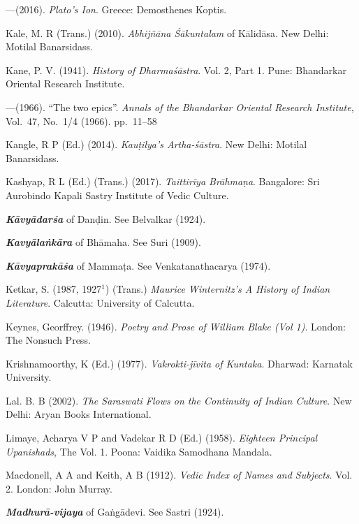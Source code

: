 \begin{thebibliography}{99}
---\kern3pt(2016). {\sl Plato’s Ion}. Greece: Demosthenes Koptis. 

Kale, M. R (Trans.) (2010). {\sl Abhijñāna Śākuntalam} of Kālidāsa. New Delhi: Motilal Banarsidass. 

Kane, P. V. (1941). {\sl History of Dharmaśāstra}. Vol. 2, Part 1. Pune: Bhandarkar Oriental Research Institute. 

---\kern3pt(1966). “The two epics”. {\sl Annals of the Bhandarkar Oriental Research Institute}, Vol.~47, No.~1/4 (1966). pp.~11--58 

Kangle, R P (Ed.) (2014). {\sl Kauṭilya’s Artha-śāstra}. New Delhi: Motilal Banarsidass. 

Kashyap, R L (Ed.) (Trans.) (2017). {\sl Taittirīya Brāhmaṇa}. Bangalore: Sri Aurobindo Kapali Sastry Institute of Vedic Culture. 

{\sl\bfseries Kāvyādarśa} of Danḍin. See Belvalkar (1924).  

{\sl\bfseries Kavyālaṅkāra} of Bhāmaha. See Suri (1909).

{\sl\bfseries Kāvyaprakāśa} of Mammaṭa. See Venkatanathacarya (1974).

Ketkar, S. (1987, 1927$^{1}$) (Trans.) {\sl Maurice Winternitz’s A History of Indian Literature}. Calcutta: University of Calcutta. 

Keynes, Georffrey. (1946). {\sl Poetry and Prose of William Blake (Vol 1)}. London: The Nonsuch Press. 

Krishnamoorthy, K (Ed.) (1977). {\sl Vakrokti-jīvita of Kuntaka}. Dharwad: Karnatak University. 

Lal. B. B (2002). {\sl The Saraswati Flows on the Continuity of Indian Culture}. New Delhi: Aryan Books International. 

Limaye, Acharya V P and Vadekar R D (Ed.) (1958). {\sl Eighteen Principal Upanishads}, The Vol. 1. Poona: Vaidika Samodhana Mandala.

Macdonell, A A and Keith, A B (1912). {\sl Vedic Index of Names and Subjects}. Vol. 2. London: John Murray.

{\sl\bfseries Madhurā-vijaya} of Gaṅgādevi. See Sastri (1924).


\end{thebibliography}
